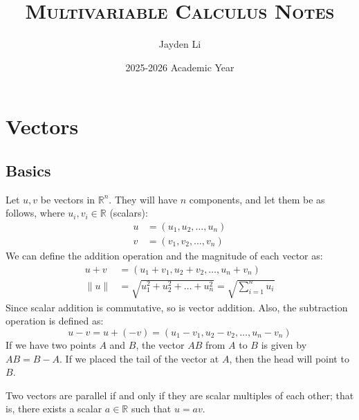 \documentclass{article}
\title{\vspace*{-40pt}\textsc{Multivariable Calculus Notes}}
\author{Jayden Li}
\date{2025-2026 Academic Year}
\begin{document}
\fontsize{11pt}{12pt}\selectfont
\setlength{\abovedisplayskip}{\abovedisplayskip/2}
\setlength{\belowdisplayskip}{\belowdisplayskip/2}
\setlength{\parindent}{0pt}
\setlength{\parskip}{2ex plus 0.5ex minus 0.2ex}
\maketitle

\setcounter{tocdepth}{1}
\tableofcontents

\section{Vectors}

\subsection{Basics}

Let $u,v$ be vectors in $\mathbb R^n$. They will have $n$ components, and let them be as follows, where $u_i,v_i\in\mathbb R$ (scalars):
\begin{align*}
	u&=(u_1,u_2,\ldots,u_n) \\
	v&=(v_1,v_2,\ldots,v_n)
\end{align*}
We can define the addition operation and the magnitude of each vector as:
\begin{align*}
	u+v&=(u_1+v_1,u_2+v_2,\ldots,u_n+v_n) \\
	\lVert u \rVert &=\sqrt{u_1^2+u_2^2+\ldots+u_n^2}=\sqrt{\sum_{i=1}^{n}u_i}
\end{align*}
Since scalar addition is commutative, so is vector addition. Also, the subtraction operation is defined as:
\begin{equation*}
    u-v=u+(-v)=(u_1-v_1,u_2-v_2,\ldots,u_n-v_n)
\end{equation*}
If we have two points $A$ and $B$, the vector $AB$ from $A$ to $B$ is given by $AB=B-A$. If we placed the tail of the vector at $A$, then the head will point to $B$.

Two vectors are parallel if and only if they are scalar multiples of each other; that is, there exists a scalar $a\in\mathbb R$ such that $u=av$.
\end{document}
